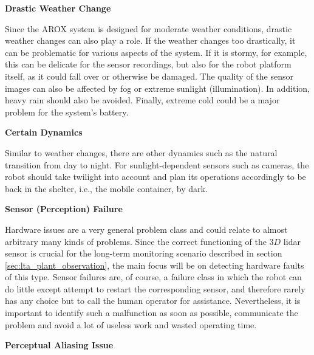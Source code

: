 \documentclass[english, master, utf8]{base/thesis_KBS}
\begin{document}
\noindent
\textbf{Drastic Weather Change}\newline

\noindent
Since the AROX system is designed for moderate weather conditions, drastic weather changes can also play a role.
If the weather changes too drastically, it can be problematic for various aspects of the system.
If it is stormy, for example, this can be delicate for the sensor recordings, but also for the robot platform itself, as it could fall over or otherwise be damaged.
The quality of the sensor images can also be affected by fog or extreme sunlight (illumination).
In addition, heavy rain should also be avoided. Finally, extreme cold could be a major problem for the system's battery.\newline

\vfill
\pagebreak

\noindent
\textbf{Certain Dynamics}\newline

\noindent
Similar to weather changes, there are other dynamics such as the natural transition from day to night. For sunlight-dependent sensors such as cameras, 
the robot should take twilight into account and plan its operations accordingly to be back in the shelter, i.e., the mobile container, by dark.\newline

\noindent
\textbf{Sensor (Perception) Failure}\newline

\noindent
Hardware issues are a very general problem class and could relate to almost arbitrary many kinds of problems. Since the correct functioning of the $3D$ lidar sensor is
crucial for the long-term monitoring scenario described in section \ref{sec:lta_plant_observation}, the main focus will be on detecting hardware faults of this type. 
Sensor failures are, of course, a failure class in which the robot can do little except attempt to restart the corresponding sensor, and therefore rarely has any choice but to 
call the human operator for assistance. Nevertheless, it is important to identify such a malfunction as soon as possible, communicate the problem and avoid a lot of useless work 
and wasted operating time.\newline

\noindent
\textbf{Perceptual Aliasing Issue}\newline
\end{document}
